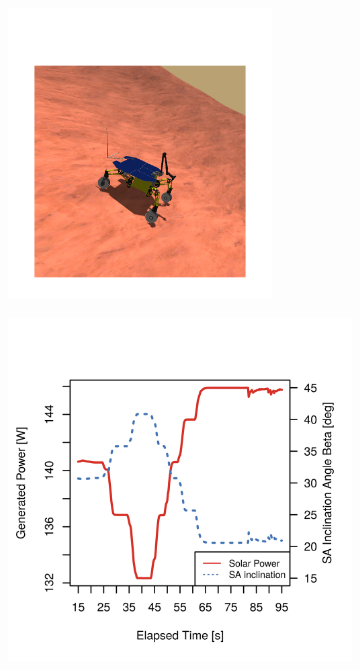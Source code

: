 \begin{figure}[h]
\captionsetup[subfigure]{justification=centering}
\vspace{-4ex}
	\centering
    \setlength{\subfigureWidth}{0.50\textwidth}
    \setlength{\graphicsHeight}{74mm}
    \hypersetup{hidelinks=true}%
    \begin{subfigure}[t]{\subfigureWidth}
        \centering
        \includegraphics[height=77mm]{sections/design/simulation/images/counter-slope.png}
		\label{fig:sub:rover-slope-compensation-simulation}
    \end{subfigure}\hfill
    \begin{subfigure}[t]{\subfigureWidth}
        \centering
        \includegraphics[height=\graphicsHeight]{sections/design/simulation/plots/slope-compensation.png}

\end{subfigure}
\end{figure}
